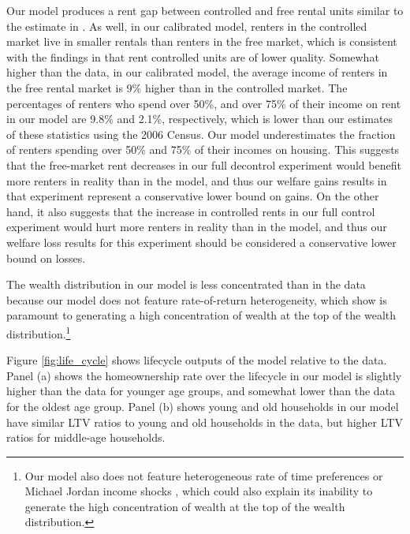 \documentclass[parskip=full]{article}
\begin{document}
Our model produces a rent gap between controlled and free rental units similar to the estimate in \citet{zhang-gou}. As well, in our calibrated model, renters in the controlled market live in smaller rentals than renters in the free market, which is consistent with the findings in \citet{zhang-gou} that rent controlled units are of lower quality. Somewhat higher than the data, in our calibrated model, the average income of renters in the free rental market is 9\% higher than in the controlled market. The percentages of renters who spend over 50\%, and over 75\% of their income on rent in our model are 9.8\% and 2.1\%, respectively, which is lower than our estimates of these statistics using the 2006 Census. Our model underestimates the fraction of renters spending over 50\% and 75\% of their incomes on housing. This suggests that the free-market rent decreases in our full decontrol experiment would benefit more renters in reality than in the model, and thus our welfare gains results in that experiment represent a conservative lower bound on gains. On the other hand, it also suggests that the increase in controlled rents in our full control experiment would hurt more renters in reality than in the model, and thus our welfare loss results for this experiment should be considered a conservative lower bound on losses. 

The wealth distribution in our model is less concentrated than in the data because our model does not feature rate-of-return heterogeneity, which \citet{fagereng} show is paramount to generating a high concentration of wealth at the top of the wealth distribution.\footnote{Our model also does not feature heterogeneous rate of time preferences \citep{ks-1998} or Michael Jordan income shocks \citet{mj-shocks}, which could also explain its inability to generate the high concentration of wealth at the top of the wealth distribution.}

Figure \ref{fig:life_cycle} shows lifecycle outputs of the model relative to the data. Panel (a) shows the homeownership rate over the lifecycle in our model is slightly higher than the data for younger age groups, and somewhat lower than the data for the oldest age group. Panel (b) shows young and old households in our model have similar LTV ratios to young and old households in the data, but higher LTV ratios for middle-age households. 
\end{document}
